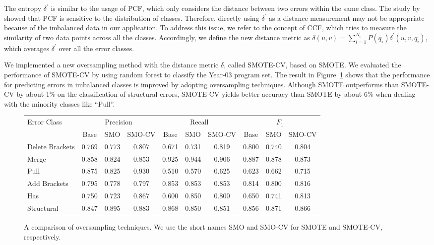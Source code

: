 \documentclass[12pt]{report}	%
\begin{document}
The entropy $\delta^{'}$
is similar to the usage of PCF, which
only considers the distance between two
errors within the same class.
The study by \cite{Mohri94anoptimal} showed that PCF is sensitive
to the distribution of classes.
Therefore, directly using $\delta^{'}$
as a distance measurement may not be appropriate
because of the imbalanced data in our application.
To address this issue, we
refer to the concept of CCF, which
tries to measure the similarity of two data points
across all the classes. Accordingly, we define
the new distance metric as
$\delta(u, v) = \sum_{i=1}^{N_{c}}P(q_{i})\delta^{'}(u, v, q_{i})$,
which averages $\delta^{'}$ over all the error classes.

We implemented a new oversampling method with the distance metric $\delta$, 
called SMOTE-CV, based on SMOTE.
We evaluated the performance of SMOTE-CV
by using random forest to classify the Year-03
program set. The result in Figure~\ref{fig:cse} 
shows that the performance for predicting
errors in imbalanced classes is improved by adopting oversampling techniques.
Although SMOTE outperforms than SMOTE-CV by about 1\% 
on the classification of structural errors,
SMOTE-CV yields better accuracy than SMOTE by about 6\%
when dealing with the minority classes like ``Pull''.

\begin{figure}
\centering
\setlength\tabcolsep{4pt}
  \begin{tabular}{  l | ccc | ccc | ccc }
\toprule
    \multirow{2}{*}{Error Class}
     & \multicolumn{3}{c|}{Precision} & \multicolumn{3}{c|}{Recall} & \multicolumn{3}{c}{$F_1$} \\
        & Base & SMO & SMO-CV &  Base & SMO & SMO-CV &  Base & SMO & SMO-CV\\ 
\midrule
    Delete Brackets & 0.769 & 0.773 & 0.807 & 0.671 & 0.731 & 0.819 & 0.800 & 0.740 & 0.804\\ 
    Merge & 0.858 & 0.824 & 0.853 & 0.925 & 0.944 & 0.906 & 0.887 & 0.878 & 0.873\\
    Pull & 0.875 & 0.825 & 0.930 & 0.510 & 0.570 & 0.625 & 0.623 & 0.662 & 0.715\\
    Add Brackets & 0.795 & 0.778 & 0.797 & 0.853 & 0.853 & 0.853 & 0.814 & 0.800 & 0.816\\
    Has \prog{\$} & 0.750 & 0.723 & 0.867 & 0.600 & 0.850 & 0.800 & 0.650 & 0.741 & 0.813 \\
    Structural & 0.847 & 0.895 & 0.883 & 0.868 & 0.850 & 0.851 & 0.856 & 0.871 & 0.866 \\
\bottomrule
  \end{tabular}
    \caption{A comparison of oversampling techniques. 
    We use the short names SMO and SMO-CV for SMOTE and SMOTE-CV, respectively.}
    \label{fig:cse}
\end{figure}
\end{document}
